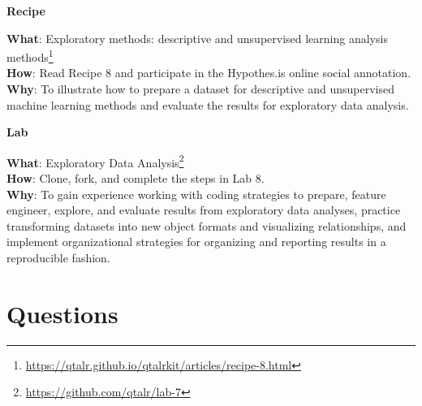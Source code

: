 \documentclass[
  letterpaper,
  DIV=11,
  numbers=noendperiod]{scrreport}
\theoremstyle{definition}
\theoremstyle{remark}
\DeclareRobustCommand{\href}[2]{#2\footnote{\url{#1}}}
\begin{document}

\begin{tcolorbox}[enhanced jigsaw, leftrule=.75mm, bottomrule=.15mm, opacityback=0, breakable, left=2mm, colback=white, toprule=.15mm, arc=.35mm, rightrule=.15mm]

\textbf{ Recipe}

\textbf{What}:
\href{https://qtalr.github.io/qtalrkit/articles/recipe-8.html}{Exploratory
methods: descriptive and unsupervised learning analysis methods}\\
\textbf{How}: Read Recipe 8 and participate in the Hypothes.is online
social annotation.\\
\textbf{Why}: To illustrate how to prepare a dataset for descriptive and
unsupervised machine learning methods and evaluate the results for
exploratory data analysis.

\end{tcolorbox}

\begin{tcolorbox}[enhanced jigsaw, leftrule=.75mm, bottomrule=.15mm, opacityback=0, breakable, left=2mm, colback=white, toprule=.15mm, arc=.35mm, rightrule=.15mm]

\textbf{ Lab}

\textbf{What}: \href{https://github.com/qtalr/lab-7}{Exploratory Data
Analysis}\\
\textbf{How}: Clone, fork, and complete the steps in Lab 8.\\
\textbf{Why}: To gain experience working with coding strategies to
prepare, feature engineer, explore, and evaluate results from
exploratory data analyses, practice transforming datasets into new
object formats and visualizing relationships, and implement
organizational strategies for organizing and reporting results in a
reproducible fashion.

\end{tcolorbox}

\hypertarget{questions-7}{%
\section*{Questions}\label{questions-7}}

\end{document}
